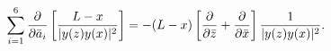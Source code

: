 \begin{equation}
\sum_{i=1}^6  {\partial \over \partial \bar a_i}\left[{L-x\over
|y(z)y(x)|^2} \right]  =-(L-x)\left[ {\partial \over \partial \bar
z}+{\partial \over \partial \bar x} \right] {1\over |y(z)y(x)|^2}.
\end{equation}


